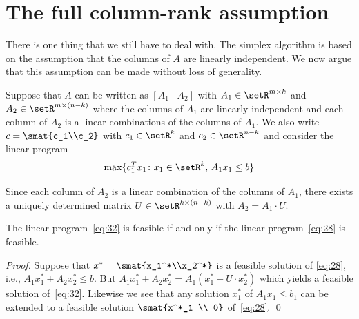   


  



\section{The full column-rank assumption}
\label{sec:full-column-rank}

There is one thing that we still have to deal with. The simplex
algorithm is based on the assumption that the columns of $A$ are
linearly independent. %
We now argue that this assumption can be made without loss of
generality. 

Suppose that $A$ can be written as $[A_1 \mid A_2]$ with $A_1 \in \setR^{m\times k}$
and $A_2 \in \setR^{m\times(n-k)}$ where the columns of $A_1$ are linearly
independent and each column of $A_2$ is a  linear combinations of the
columns of $A_1$.  We also write $c = \smat{c_1\\c_2}$ with $c_1 \in
\setR^k$ and $c_2 \in \setR^{n-k}$ and consider the linear program 
\begin{equation}
  \label{eq:32}
  \max\{c_1^Tx_1 \colon x_1 \in \setR^{k} , \, A_1x_1\leq b\}
\end{equation}


Since each column of $A_2$ is a linear combination of the columns of
$A_1$, there exists a uniquely determined  matrix $U \in \setR^{k\times(n-k)}$
with $A_2 = A_1\cdot U$.  


\begin{lemma}
  \label{lem:7}
  The linear program~\eqref{eq:32} is feasible if and only if the
  linear program~\eqref{eq:28} is feasible. 
\end{lemma}


\begin{proof}
  Suppose  that $x^* =\smat{x_1^*\\x_2^*}$ is a feasible
  solution of \eqref{eq:28}, i.e.,  $A_1x_1^* + A_2 x_2^*\leq b$. But
  $A_1x_1^* + A_2x_2^* = A_1 (x_1^* + U \cdot x_2^*)$ which yields a
  feasible solution of~\eqref{eq:32}. Likewise we see that any
  solution $x_1^*$ of $A_1x_1\leq b_1$ can be extended to a feasible
  solution $\smat{x^*_1 \\ 0}$ of~\eqref{eq:28}. \qed 
\end{proof}


